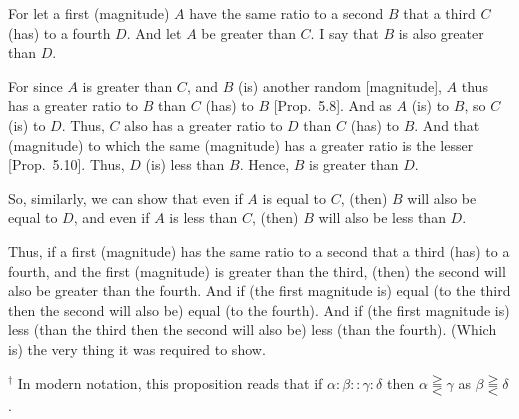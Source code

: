 \begin{Parallel}{}{}
{\epsfysize=0.5in
\centerline{}

For let a first (magnitude) $A$ have the same ratio to a second $B$  that a
third $C$ (has) to a fourth $D$. And let $A$ be greater than $C$. I say that $B$
is also greater than $D$.

For since $A$ is greater than $C$, and $B$ (is) another random [magnitude],
$A$ thus has a greater ratio to $B$ than $C$ (has) to $B$ [Prop.~5.8]. And as $A$ (is) to $B$, so $C$ (is) to
$D$. Thus, $C$ also has a greater ratio to $D$ than $C$ (has) to $B$. And that (magnitude) to
which the same (magnitude) has a greater ratio is the lesser
 [Prop.~5.10]. Thus, $D$
(is) less than $B$. Hence, $B$ is greater than $D$.

So, similarly, we can show that even if $A$ is equal to $C$, (then) $B$ will also be equal to $D$, and even if $A$ is less than $C$, (then) $B$ will also be less than $D$.

Thus, if a first (magnitude) has the same ratio to a second  that a third (has) to a fourth, and the first (magnitude) is greater than the third,
(then) the second will also be greater than the fourth. And if (the first magnitude is) equal
(to the third then the second will also be) equal (to the fourth). And
if (the first magnitude  is) less (than the third then the second will also be) less (than the fourth). (Which is) the very thing it was required to show.}
\end{Parallel}
{\footnotesize \noindent$^\dag$ In modern notation, this proposition
reads that if $\alpha:\beta::\gamma:\delta$ then $\alpha \gtreqqless \gamma$ as
$\beta\gtreqqless\delta$.}

